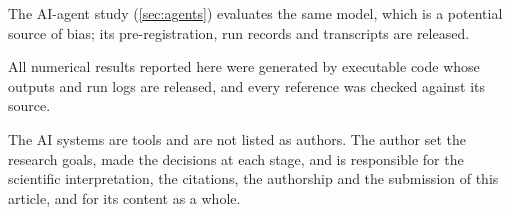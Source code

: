 \documentclass[11pt]{article}
\begin{document}
The AI-agent study (\cref{sec:agents}) evaluates the same model, which is a potential source of bias; its
pre-registration, run records and transcripts are released.

All numerical results reported here were generated by executable code whose outputs and run logs are released, and every
reference was checked against its source.

The AI systems are tools and are not listed as authors. The author set the research goals, made the decisions at each
stage, and is responsible for the scientific interpretation, the citations, the authorship and the submission of this
article, and for its content as a whole.



\end{document}

